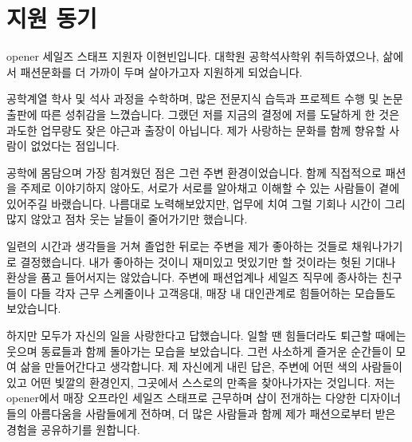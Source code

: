 \section*{지원 동기}
opener 세일즈 스태프 지원자 이현빈입니다. 대학원 공학석사학위 취득하였으나, 삶에서 패션문화를 더 가까이 두며 살아가고자 지원하게 되었습니다.

공학계열 학사 및 석사 과정을 수학하며, 많은 전문지식 습득과 프로젝트 수행 및 논문출판에 따른 성취감을 느꼈습니다. 그랬던 저를 지금의 결정에 저를 도달하게 한 것은 과도한 업무량도 잦은 야근과 출장이 아닙니다. 제가 사랑하는 문화를 함께 향유할 사람이 없었다는 점입니다.

공학에 몸담으며 가장 힘겨웠던 점은 그런 주변 환경이었습니다. 함께 직접적으로 패션을 주제로 이야기하지 않아도, 서로가 서로를 알아채고 이해할 수 있는 사람들이 곁에 있어주길 바랬습니다. 나름대로 노력해보았지만, 업무에 치여 그럴 기회나 시간이 그리 많지 않았고 점차 웃는 날들이 줄어가기만 했습니다.

일련의 시간과 생각들을 거쳐 졸업한 뒤로는 주변을 제가 좋아하는 것들로 채워나가기로 결정했습니다. 내가 좋아하는 것이니 재미있고 멋있기만 할 것이라는 헛된 기대나 환상을 품고 들어서지는 않았습니다. 주변에 패션업계나 세일즈 직무에 종사하는 친구들이 다들 각자 근무 스케줄이나 고객응대, 매장 내 대인관계로 힘들어하는 모습들도 보았습니다.

하지만 모두가 자신의 일을 사랑한다고 답했습니다. 일할 땐 힘들더라도 퇴근할 때에는 웃으며 동료들과 함께 돌아가는 모습을 보았습니다. 그런 사소하게 즐거운 순간들이 모여 삶을 만들어간다고 생각합니다. 제 자신에게 내린 답은, 주변에 어떤 색의 사람들이 있고 어떤 빛깔의 환경인지, 그곳에서 스스로의 만족을 찾아나가자는 것입니다.
저는 opener에서 매장 오프라인 세일즈 스태프로 근무하며 샵이 전개하는 다양한 디자이너들의 아름다움을 사람들에게 전하며, 더 많은 사람들과 함께 제가 패션으로부터 받은 경험을 공유하기를 원합니다.



